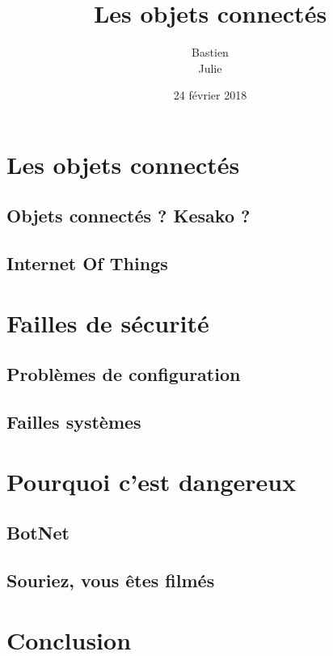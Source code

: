 \documentclass[a4paper]{report}
\title{Les objets connectés}
\author{Bastien \bsc{Labouche}\\Julie \bsc{Lopez}}
\date{24 février 2018}
\begin{document}
	
	\maketitle
	
	\tableofcontents
	
	\section{Les objets connectés}
	\subsection{Objets connectés ? Kesako ?}
	\subsection{Internet Of Things}
	
	\section{Failles de sécurité}
	\subsection{Problèmes de configuration}
	\subsection{Failles systèmes}
	
	\section{Pourquoi c'est dangereux}
	\subsection{BotNet}
	\subsection{Souriez, vous êtes filmés}
	
	\section{Conclusion}
\end{document}
